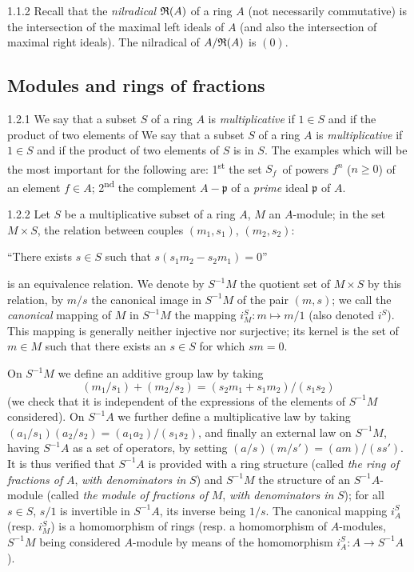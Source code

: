\documentclass[10pt,oneside]{book}
\begin{document}
\begin{env}{1.1.2}
\label{env-0.1.1.2}
Recall that the \emph{nilradical} $\mathfrak{R}(A)$ of a ring $A$ (not necessarily commutative) is the
intersection of the maximal left ideals of $A$ (and also the intersection of maximal
right ideals). The nilradical of $A/\mathfrak{R}(A)$ is $(0)$.
\end{env}

\subsection{Modules and rings of fractions}
\label{0-prelim-1.2}

\begin{env}{1.2.1}
\label{env-0.1.2.1}
We say that a subset $S$ of a ring $A$ is \emph{multiplicative} if $1\in S$ and if the
product of two elements of
We say that a subset $S$ of a ring $A$ is \emph{multiplicative} if $1\in S$ and if the
product of two elements of $S$ is in $S$. The examples which will be the most important for
the following are: 1\textsuperscript{st} the set $S_f$ of powers $f^n$ ($n\geqslant 0$) of an
element $f\in A$; 2\textsuperscript{nd} the complement $A-\mathfrak{p}$ of a \emph{prime}
ideal $\mathfrak{p}$ of $A$.
\end{env}

\begin{env}{1.2.2}
\label{env-0.1.2.2}
Let $S$ be a multiplicative subset of a ring $A$, $M$ an $A$-module; in the set $M\times S$, the relation between
couples $(m_1,s_1)$, $(m_2,s_2)$:
\begin{center}
   ``There exists $s\in S$ such that $s(s_1 m_2-s_2 m_1)=0$''
\end{center}
is an equivalence relation. We denote by $S^{-1}M$ the quotient set of $M\times S$ by this relation, by $m/s$ the canonical
image in $S^{-1}M$ of the pair $(m,s)$; we call the \emph{canonical} mapping of $M$ in $S^{-1}M$ the mapping $i_M^S:m\mapsto m/1$
(also denoted $i^S$). This mapping is generally neither injective nor surjective; its kernel is the set of $m\in M$ such that there
exists an $s\in S$ for which $sm=0$.

On $S^{-1}M$ we define an additive group law by taking
\[
  (m_1/s_1)+(m_2/s_2)=(s_2 m_1+s_1 m_2)/(s_1 s_2)
\]
(we check that it is independent of the expressions of the elements of $S^{-1}M$ considered). On $S^{-1}A$ we further define
a multiplicative law by taking $(a_1/s_1)(a_2/s_2)=(a_1 a_2)/(s_1 s_2)$, and finally an external law on $S^{-1}M$, having
$S^{-1}A$ as a set of operators, by setting $(a/s)(m/s')=(am)/(ss')$. It is thus verified that $S^{-1}A$ is provided with a
ring structure (called \emph{the ring of fractions of} $A$, \emph{with denominators in} $S$) and $S^{-1}M$ the structure of
an $S^{-1}A$-module (called \emph{the  module of fractions of} $M$, \emph{with denominators in} $S$); for all $s\in S$,
$s/1$ is invertible in $S^{-1}A$, its inverse being $1/s$. The canonical mapping $i_A^S$ (resp. $i_M^S$) is a homomorphism
of rings (resp. a homomorphism of $A$-modules, $S^{-1}M$ being considered $A$-module by means of the homomorphism
$i_A^S:A\to S^{-1}A$).
\end{env}
\end{document}
